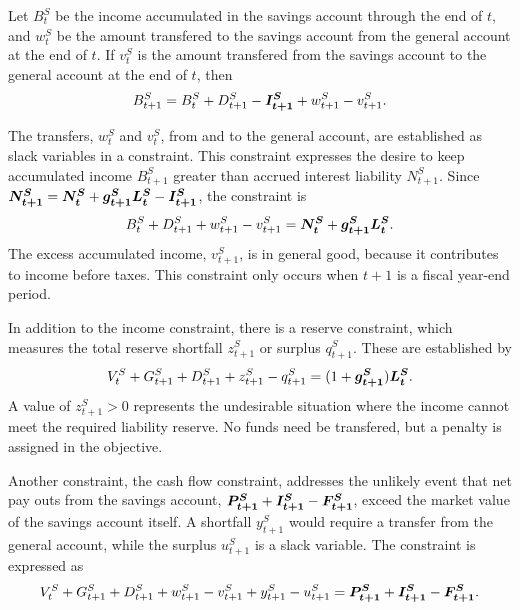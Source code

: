 Let $B_t^S$ be the income accumulated in the savings account through the end of $t$, and $w^S_{t}$ be the amount transfered to the savings account from the general account at the end of $t$.  If $v^S_{t}$ is the amount transfered from the savings account to the general account at the end of $t$, then 
\begin{equation*}
B_{t+1}^S = B_t^S + D_{t+1}^S -\mathbf{\boldsymbol{I_{t+1}^S}} + w_{t+1}^S - v_{t+1}^S.
\end{equation*}

The transfers, $w^S_{t}$ and $v^S_{t}$, from and to the general account, are established as slack variables in a constraint.  This constraint expresses the desire to keep accumulated income $B_{t+1}^S$ greater than accrued interest liability $N_{t+1}^S$.  Since $\mathbf{\boldsymbol{N_{t+1}^S}} = \mathbf{\boldsymbol{N_t^S}} + \mathbf{\boldsymbol{g_{t+1}^S}} \mathbf{\boldsymbol{L_t^S}} - \mathbf{\boldsymbol{I_{t+1}^S}}$, the constraint is
\begin{equation*}
B_t^S + D_{t+1}^S + w_{t+1}^S - v_{t+1}^S = \mathbf{\boldsymbol{N_t^S}} + \mathbf{\boldsymbol{g_{t+1}^S}} \mathbf{\boldsymbol{L_t^S}}.
\end{equation*}
The excess accumulated income, $v_{t+1}^S$, is in general good, because it contributes to income before taxes.  This constraint only occurs when $t+1$ is a fiscal year-end period.

In addition to the income constraint, there is a reserve constraint, which measures the total reserve shortfall $z_{t+1}^S$ or surplus $q_{t+1}^S$.  These are established by
\begin{equation*}
V_t^S + G_{t+1}^S + D_{t+1}^S + z_{t+1}^S - q_{t+1}^S = (1+\mathbf{\boldsymbol{g_{t+1}^S}}) \mathbf{\boldsymbol{L_t^S}}.
\end{equation*}
A value of $z_{t+1}^S >0$ represents the undesirable situation where the income cannot meet the required liability reserve.  No funds need be transfered, but a penalty is assigned in the objective.  

Another constraint, the cash flow constraint, addresses the unlikely event that net pay outs from the savings account, $\mathbf{\boldsymbol{P^S_{t+1}}} + \mathbf{\boldsymbol{I^S_{t+1}}} - \mathbf{\boldsymbol{F^S_{t+1}}}$, exceed the market value of the savings account itself.  A shortfall $y^S_{t+1}$ would require a transfer from the general account, while the surplus $u^S_{t+1}$ is a slack variable.  The constraint is expressed as
\begin{equation}
\label{RY:savcashflow}
V^S_t + G^S_{t+1} + D^S_{t+1} + w^S_{t+1} - v^S_{t+1} + y^S_{t+1} - u^S_{t+1} = \mathbf{\boldsymbol{P^S_{t+1}}} + \mathbf{\boldsymbol{I^S_{t+1}}} - \mathbf{\boldsymbol{F^S_{t+1}}}.
\end{equation}

